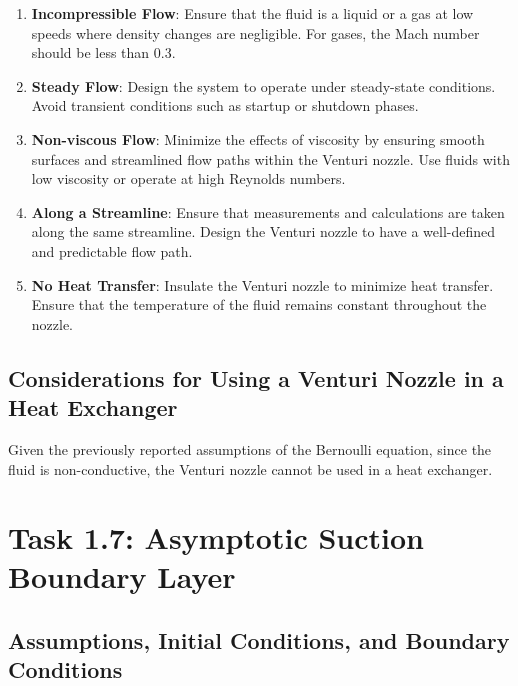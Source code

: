 \documentclass{article}
\begin{document}
\begin{enumerate}
    \item \textbf{Incompressible Flow}: Ensure that the fluid is a liquid or a gas at low speeds where density changes are negligible. For gases, the Mach number should be less than 0.3.

    \item \textbf{Steady Flow}: Design the system to operate under steady-state conditions. Avoid transient conditions such as startup or shutdown phases.

    \item \textbf{Non-viscous Flow}: Minimize the effects of viscosity by ensuring smooth surfaces and streamlined flow paths within the Venturi nozzle. Use fluids with low viscosity or operate at high Reynolds numbers.

    \item \textbf{Along a Streamline}: Ensure that measurements and calculations are taken along the same streamline. Design the Venturi nozzle to have a well-defined and predictable flow path.

    \item \textbf{No Heat Transfer}: Insulate the Venturi nozzle to minimize heat transfer. Ensure that the temperature of the fluid remains constant throughout the nozzle.
    
\end{enumerate}

\subsection{Considerations for Using a Venturi Nozzle in a Heat Exchanger}

Given the previously reported assumptions of the Bernoulli equation, since the fluid is non-conductive, the Venturi nozzle cannot be used in a heat exchanger.


\section{Task 1.7: Asymptotic Suction Boundary Layer}

\subsection{Assumptions, Initial Conditions, and Boundary Conditions}
\end{document}
